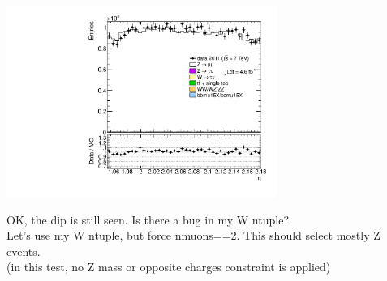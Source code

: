 {\includegraphics[width=0.66\textwidth]{dates/20130306/figures/etaphi/Z_10_A_stack_lN_eta_ALL.pdf} 
\cole
}

 {
OK, the dip is still seen. Is there a bug in my W ntuple? \\
Let's use my W ntuple, but force nmuons==2. This should select mostly Z events. \\
(in this test, no Z mass or opposite charges constraint is applied)
}
